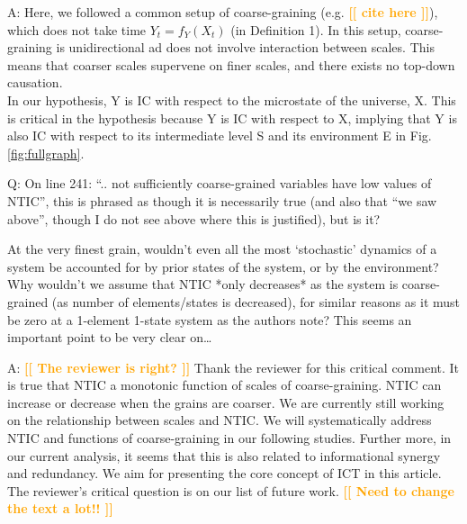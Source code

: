 \documentclass[utf8]{article}
\newcounter{cQuestion}[section]
\newenvironment{question}
    {\refstepcounter{cQuestion}\color{Blue}\noindent\newline Q\thecQuestion:}
    {~\newline}
\newenvironment{ans}  
    {\color{Black}\noindent A:}
    {~\newline}
\newcommand{\toWrite}[1]{\noindent
	\textcolor{Orange}{\textbf{[[ #1 ]]}}}
\begin{document}
    	\begin{ans}
			Here, we followed a common setup of coarse-graining (e.g. \toWrite{cite here}), which does not take time $Y_t=f_Y(X_t)$ (in Definition 1). In this setup, coarse-graining is unidirectional ad does not involve interaction between scales. This means that coarser scales supervene on finer scales, and there exists no top-down causation. \\
			In our hypothesis, Y is IC with respect to the microstate of the universe, X. This is critical in the hypothesis because Y is IC with respect to X, implying that Y is also IC with respect to its intermediate level S and its environment E in Fig. \ref{fig:fullgraph}.
    	\end{ans}
    
    
    	\begin{question}            
    		On line 241: “.. not sufficiently coarse-grained variables have low values of NTIC”, this is phrased as though it is necessarily true (and also that “we saw above”, though I do not see above where this is justified), but is it?
    		
    		At the very finest grain, wouldn’t even all the most ‘stochastic’ dynamics of a system be accounted for by prior states of the system, or by the environment? Why wouldn’t we assume that NTIC *only decreases* as the system is coarse-grained (as number of elements/states is decreased), for similar reasons as it must be zero at a 1-element 1-state system as the authors note? This seems an important point to be very clear on…
    	\end{question}
    
    	\begin{ans}
    		\toWrite{The reviewer is right?}
    		Thank the reviewer for this critical comment. It is true that NTIC a monotonic function of scales of coarse-graining. NTIC can increase or decrease when the grains are coarser. We are currently still working on the relationship between scales and NTIC. 
    		We will systematically address NTIC and functions of coarse-graining in our following studies. 
    		Further more, in our current analysis, it seems that this is also related to informational synergy and redundancy. We aim for presenting the core concept of ICT in this article.
    		The reviewer's critical question is on our list of future work. 
    		\toWrite{Need to change the text a lot!!}
    	\end{ans}
    
\end{document}

